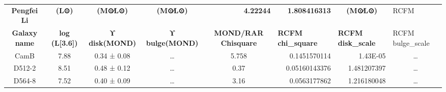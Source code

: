 \documentclass[reprint,%
 amsmath,amssymb,
 aps,
]{revtex4-1}
\begin{document}
\begin{table}[]
\begin{tabular}{cccccrrc}
\rowcolor[HTML]{CCCCCC} 
\textbf{Pengfei Li}  & \textbf{(L⊙)}             & \textbf{(M⊙∕L⊙)}      & \textbf{(M⊙∕L⊙)}       & \multicolumn{1}{r}{\cellcolor[HTML]{CCCCCC}\textbf{4.22244}} & \textbf{1.808416313}                                                  & \multicolumn{1}{c}{\cellcolor[HTML]{CCCCCC}\textbf{(M⊙∕L⊙)}}          & \multicolumn{1}{l}{\cellcolor[HTML]{CCCCCC}RCFM}              \\
\rowcolor[HTML]{CCCCCC} 
\textbf{Galaxy name} & \textbf{log (L{[}3.6{]})} & \textbf{ϒ disk(MOND)} & \textbf{ϒ bulge(MOND)} & \textbf{MOND/RAR Chisquare}                                  & \multicolumn{1}{l}{\cellcolor[HTML]{CCCCCC}\textbf{RCFM chi\_square}} & \multicolumn{1}{l}{\cellcolor[HTML]{CCCCCC}\textbf{RCFM disk\_scale}} & \multicolumn{1}{l}{\cellcolor[HTML]{CCCCCC}RCFM bulge\_scale} \\
\rowcolor[HTML]{F3F3F3} 
CamB                 & 7.88                      & 0.34 ± 0.08           & …                      & 5.758                                                        & 0.1451570114                                                          & 1.43E-05                                                              & …                                                             \\
\rowcolor[HTML]{F3F3F3} 
D512-2               & 8.51                      & 0.48 ± 0.12           & …                      & 0.37                                                         & 0.05160143376                                                         & 1.481207397                                                           & …                                                             \\
\rowcolor[HTML]{F3F3F3} 
D564-8               & 7.52                      & 0.40 ± 0.09           & …                      & 3.16                                                         & 0.0563177862                                                          & 1.216180048                                                           & …                                                             \\

\end{tabular}
\end{table}
\end{document}
